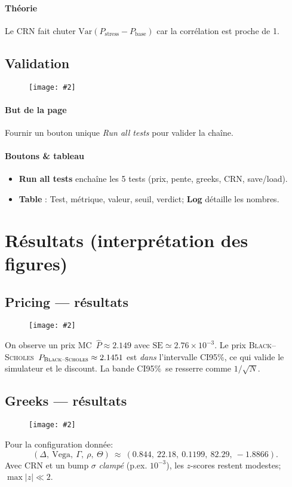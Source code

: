 \documentclass[11pt,a4paper]{article}
\newcommand{\imgfull}[2][\textwidth]{\begin{figure}[H]\centering\texttt{[image: \#2]}\end{figure}}
\newcommand{\bs}{\textsc{Black--Scholes}}
\newcommand{\ci}{\textsc{CI95}\%}
\newcommand{\mc}{\textsc{MC}}
\begin{document}
\paragraph{Théorie}
Le CRN fait chuter \(\mathrm{Var}(P_{\text{stress}}-P_{\text{base}})\) car la corrélation est proche de 1.

\subsection{Validation}
\imgfull{validation.png}
\paragraph{But de la page} Fournir un bouton unique \emph{Run all tests} pour valider la chaîne.
\paragraph{Boutons \& tableau}
\begin{itemize}[leftmargin=*]
  \item \textbf{Run all tests} enchaîne les 5 tests (prix, pente, greeks, CRN, save/load).
  \item \textbf{Table} : Test, métrique, valeur, seuil, verdict; \textbf{Log} détaille les nombres.
\end{itemize}

\section{Résultats (interprétation des figures)}
\subsection{Pricing — résultats}
\imgfull{pricing_res.png}
On observe un prix \mc\ \(\hat P\approx 2.149\) avec \(\mathrm{SE}\simeq 2.76\times10^{-3}\). Le prix \bs\ \(P_{\bs}\approx 2.1451\) est \emph{dans} l’intervalle \ci, ce qui valide le simulateur et le discount. La bande \ci\ se resserre comme \(1/\sqrt{N}\).

\subsection{Greeks — résultats}
\imgfull{greeks_res.png}
Pour la configuration donnée:
\[
(\Delta,\ \text{Vega},\ \Gamma,\ \rho,\ \Theta)\ \approx\ (0.844,\ 22.18,\ 0.1199,\ 82.29,\ -1.8866).
\]
Avec CRN et un bump \(\sigma\) \emph{clampé} (p.ex. \(10^{-3}\)), les \(z\)-scores restent modestes; \(\max|z|\ll 2\).
\end{document}
